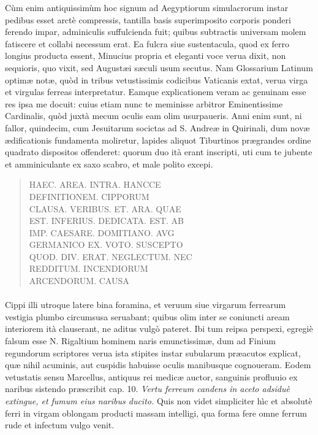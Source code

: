 \documentclass[a4paper, 11pt, oneside, polutonikogreek, latin]{article}
\begin{document}
Cùm enim antiquissimùm hoc signum ad Aegyptiorum simulacrorum instar pedibus esset arctè compressis, tantilla basis superimposito corporis ponderi ferendo impar, adminiculis suffulcienda fuit; quibus subtractis universam molem fatiscere et collabi necessum erat. Ea fulcra siue sustentacula, quod ex ferro longius producta essent, Minucius propria et eleganti voce verua dixit, non sequioris, quo vixit, sed Augustæi sæculi usum secutus. Nam Glossarium Latinum optimæ notæ, quòd in tribus vetustissimis codicibus Vaticanis extat, verua virga et virgulas ferreas interpretatur. Eamque explicationem veram ac genuinam esse res ipsa me docuit: cuius etiam nunc te meminisse arbitror Eminentissime Cardinalis, quòd juxtà mecum oculis eam olim usurpaueris. Anni enim sunt, ni fallor, quindecim, cum Jesuitarum socictas ad S. Andreæ in Quirinali, dum novæ ædificationis fundamenta moliretur, lapides aliquot Tiburtinos prægrandes ordine quadrato dispositos offenderet: quorum duo ità erant inscripti, uti cum te jubente et amminiculante ex saxo scabro, et male polito excepi.
\begin{quote}
HAEC. AREA. INTRA. HANCCE\\
DEFINITIONEM. CIPPORUM\\
CLAUSA. VERIBUS. ET. ARA. QUAE\\
EST. INFERIUS. DEDICATA. EST. AB\\
IMP. CAESARE. DOMITIANO. AVG\\
GERMANICO EX. VOTO. SUSCEPTO\\
QUOD. DIV. ERAT. NEGLECTUM. NEC\\
REDDITUM. INCENDIORUM\\
ARCENDORUM. CAUSA\\
\end{quote}
\vspace*{-8mm}
\paragraph{}
Cippi illi utroque latere bina foramina, et veruum siue virgarum ferrearum vestigia plumbo circumsusa seruabant; quibus olim inter se coniuncti aream interiorem ità clauserant, ne aditus vulgò pateret. Ibi tum reipsa perspexi, egregiè falsum esse N. Rigaltium hominem naris emunctissimæ, dum ad Finium regundorum scriptores verua ista stipites instar subularum præacutos explicat, quæ nihil acuminis, aut cuspidis habuisse oculis manibusque cognoueram. Eodem vetustatis sensu Marcellus, antiquus rei medicæ auctor, sanguinis profluuio ex naribus sistendo præscribit cap. 10. \emph{Vertu ferreum candens in aceto adsiduè extingue, et fumum eius naribus ducito.} Quis non videt simpliciter hìc et absolutè ferri in virgam oblongam producti massam intelligi, qua forma fere omne ferrum rude et infectum vulgo venit.
\end{document}
